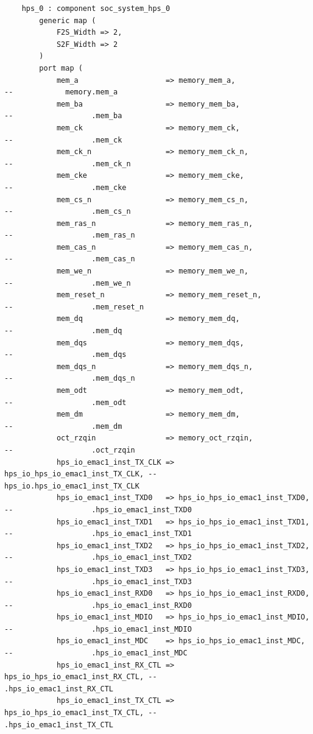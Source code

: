 \documentclass[conference]{IEEEtran}
\begin{document}
\begin{lstlisting}
	hps_0 : component soc_system_hps_0
		generic map (
			F2S_Width => 2,
			S2F_Width => 2
		)
		port map (
			mem_a                    => memory_mem_a,                    --            memory.mem_a
			mem_ba                   => memory_mem_ba,                   --                  .mem_ba
			mem_ck                   => memory_mem_ck,                   --                  .mem_ck
			mem_ck_n                 => memory_mem_ck_n,                 --                  .mem_ck_n
			mem_cke                  => memory_mem_cke,                  --                  .mem_cke
			mem_cs_n                 => memory_mem_cs_n,                 --                  .mem_cs_n
			mem_ras_n                => memory_mem_ras_n,                --                  .mem_ras_n
			mem_cas_n                => memory_mem_cas_n,                --                  .mem_cas_n
			mem_we_n                 => memory_mem_we_n,                 --                  .mem_we_n
			mem_reset_n              => memory_mem_reset_n,              --                  .mem_reset_n
			mem_dq                   => memory_mem_dq,                   --                  .mem_dq
			mem_dqs                  => memory_mem_dqs,                  --                  .mem_dqs
			mem_dqs_n                => memory_mem_dqs_n,                --                  .mem_dqs_n
			mem_odt                  => memory_mem_odt,                  --                  .mem_odt
			mem_dm                   => memory_mem_dm,                   --                  .mem_dm
			oct_rzqin                => memory_oct_rzqin,                --                  .oct_rzqin
			hps_io_emac1_inst_TX_CLK => hps_io_hps_io_emac1_inst_TX_CLK, --            hps_io.hps_io_emac1_inst_TX_CLK
			hps_io_emac1_inst_TXD0   => hps_io_hps_io_emac1_inst_TXD0,   --                  .hps_io_emac1_inst_TXD0
			hps_io_emac1_inst_TXD1   => hps_io_hps_io_emac1_inst_TXD1,   --                  .hps_io_emac1_inst_TXD1
			hps_io_emac1_inst_TXD2   => hps_io_hps_io_emac1_inst_TXD2,   --                  .hps_io_emac1_inst_TXD2
			hps_io_emac1_inst_TXD3   => hps_io_hps_io_emac1_inst_TXD3,   --                  .hps_io_emac1_inst_TXD3
			hps_io_emac1_inst_RXD0   => hps_io_hps_io_emac1_inst_RXD0,   --                  .hps_io_emac1_inst_RXD0
			hps_io_emac1_inst_MDIO   => hps_io_hps_io_emac1_inst_MDIO,   --                  .hps_io_emac1_inst_MDIO
			hps_io_emac1_inst_MDC    => hps_io_hps_io_emac1_inst_MDC,    --                  .hps_io_emac1_inst_MDC
			hps_io_emac1_inst_RX_CTL => hps_io_hps_io_emac1_inst_RX_CTL, --                  .hps_io_emac1_inst_RX_CTL
			hps_io_emac1_inst_TX_CTL => hps_io_hps_io_emac1_inst_TX_CTL, --                  .hps_io_emac1_inst_TX_CTL

\end{lstlisting}
\end{document}
